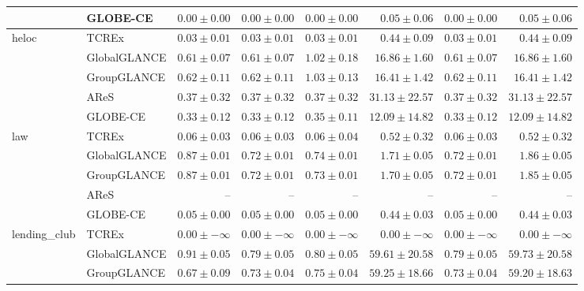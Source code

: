 \begin{table}[ht]
\begin{center}
\begin{sc}
\begin{scriptsize}
\begin{tabular}{l|l|rrrrrr}
 & GLOBE-CE & $\boldsymbol{0.00\pm{0.00}}$ & $\boldsymbol{0.00\pm{0.00}}$ & $\boldsymbol{0.00\pm{0.00}}$ & $0.05\pm{0.06}$ & $\boldsymbol{0.00\pm{0.00}}$ & $0.05\pm{0.06}$ \\
\midrule
\multirow{5}{*}{heloc} & TCREx & $\boldsymbol{0.03\pm{0.01}}$ & $\boldsymbol{0.03\pm{0.01}}$ & $\boldsymbol{0.03\pm{0.01}}$ & $\boldsymbol{0.44\pm{0.09}}$ & $\boldsymbol{0.03\pm{0.01}}$ & $\boldsymbol{0.44\pm{0.09}}$ \\
 & GlobalGLANCE & $0.61\pm{0.07}$ & $0.61\pm{0.07}$ & $1.02\pm{0.18}$ & $16.86\pm{1.60}$ & $0.61\pm{0.07}$ & $16.86\pm{1.60}$ \\
 & GroupGLANCE & $0.62\pm{0.11}$ & $0.62\pm{0.11}$ & $1.03\pm{0.13}$ & $16.41\pm{1.42}$ & $0.62\pm{0.11}$ & $16.41\pm{1.42}$ \\
 & AReS & $0.37\pm{0.32}$ & $0.37\pm{0.32}$ & $0.37\pm{0.32}$ & $31.13\pm{22.57}$ & $0.37\pm{0.32}$ & $31.13\pm{22.57}$ \\
 & GLOBE-CE & $0.33\pm{0.12}$ & $0.33\pm{0.12}$ & $0.35\pm{0.11}$ & $12.09\pm{14.82}$ & $0.33\pm{0.12}$ & $12.09\pm{14.82}$ \\
\midrule
\multirow{5}{*}{law} & TCREx & $0.06\pm{0.03}$ & $0.06\pm{0.03}$ & $0.06\pm{0.04}$ & $0.52\pm{0.32}$ & $0.06\pm{0.03}$ & $0.52\pm{0.32}$ \\
 & GlobalGLANCE & $0.87\pm{0.01}$ & $0.72\pm{0.01}$ & $0.74\pm{0.01}$ & $1.71\pm{0.05}$ & $0.72\pm{0.01}$ & $1.86\pm{0.05}$ \\
 & GroupGLANCE & $0.87\pm{0.01}$ & $0.72\pm{0.01}$ & $0.73\pm{0.01}$ & $1.70\pm{0.05}$ & $0.72\pm{0.01}$ & $1.85\pm{0.05}$ \\
 & AReS & -- & -- & -- & -- & -- & -- \\
 & GLOBE-CE & $\boldsymbol{0.05\pm{0.00}}$ & $\boldsymbol{0.05\pm{0.00}}$ & $\boldsymbol{0.05\pm{0.00}}$ & $\boldsymbol{0.44\pm{0.03}}$ & $\boldsymbol{0.05\pm{0.00}}$ & $\boldsymbol{0.44\pm{0.03}}$ \\
\midrule
\multirow{5}{*}{lending\_club} & TCREx & $\boldsymbol{0.00\pm{-\infty}}$ & $\boldsymbol{0.00\pm{-\infty}}$ & $\boldsymbol{0.00\pm{-\infty}}$ & $\boldsymbol{0.00\pm{-\infty}}$ & $\boldsymbol{0.00\pm{-\infty}}$ & $\boldsymbol{0.00\pm{-\infty}}$ \\
 & GlobalGLANCE & $0.91\pm{0.05}$ & $0.79\pm{0.05}$ & $0.80\pm{0.05}$ & $59.61\pm{20.58}$ & $0.79\pm{0.05}$ & $59.73\pm{20.58}$ \\
 & GroupGLANCE & $0.67\pm{0.09}$ & $0.73\pm{0.04}$ & $0.75\pm{0.04}$ & $59.25\pm{18.66}$ & $0.73\pm{0.04}$ & $59.20\pm{18.63}$ \\

\end{tabular}
\end{scriptsize}
\end{sc}
\end{center}
\end{table}
